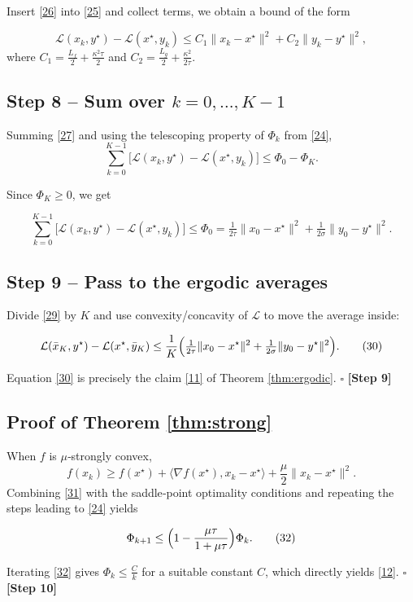 \documentclass{article}
\begin{document}
Insert \eqref{26} into \eqref{25} and collect terms, we obtain a bound of the form

\[
\mathcal L(x_{k},y^{\star})-\mathcal L(x^{\star},y_{k})
\le C_{1}\|x_{k}-x^{\star}\|^{2}+C_{2}\|y_{k}-y^{\star}\|^{2},
\tag{27}
\]
where $C_{1}=\tfrac{L_{f}}{2}+\tfrac{\kappa^{2}\tau}{2}$ and $C_{2}=\tfrac{L_{g}}{2}+\tfrac{\kappa^{2}}{2\tau}$.

\subsection*{Step 8 – Sum over $k=0,\dots,K-1$}
Summing \eqref{27} and using the telescoping property of $\Phi_{k}$ from \eqref{24},
\[
\sum_{k=0}^{K-1}\bigl[\mathcal L(x_{k},y^{\star})-\mathcal L(x^{\star},y_{k})\bigr]
\le \Phi_{0}-\Phi_{K}. \tag{28}
\]

Since $\Phi_{K}\ge0$, we get

\[
\sum_{k=0}^{K-1}\bigl[\mathcal L(x_{k},y^{\star})-\mathcal L(x^{\star},y_{k})\bigr]
\le \Phi_{0}
= \tfrac{1}{2\tau}\|x_{0}-x^{\star}\|^{2}
+\tfrac{1}{2\sigma}\|y_{0}-y^{\star}\|^{2}. \tag{29}
\]

\subsection*{Step 9 – Pass to the ergodic averages}
Divide \eqref{29} by $K$ and use convexity/concavity of $\mathcal L$ to move the average inside:

\[
\mathcal L(\bar x_{K},y^{\star})-\mathcal L(x^{\star},\bar y_{K})
\le \frac{1}{K}\Bigl(\tfrac{1}{2\tau}\|x_{0}-x^{\star}\|^{2}
+\tfrac{1}{2\sigma}\|y_{0}-y^{\star}\|^{2}\Bigr). \tag{30}
\]

Equation \eqref{30} is precisely the claim \eqref{11} of Theorem \ref{thm:ergodic}.  $\square$ \hfill\textbf{[Step 9]}

\subsection*{Proof of Theorem \ref{thm:strong}}
When $f$ is $\mu$‑strongly convex,
\[
f(x_{k})\ge f(x^{\star})+\langle \nabla f(x^{\star}),x_{k}-x^{\star}\rangle+\frac{\mu}{2}\|x_{k}-x^{\star}\|^{2}. \tag{31}
\]
Combining \eqref{31} with the saddle‑point optimality conditions and repeating the steps leading to \eqref{24} yields  

\[
\Phi_{k+1}\le \Bigl(1-\frac{\mu\tau}{1+\mu\tau}\Bigr)\Phi_{k}. \tag{32}
\]

Iterating \eqref{32} gives $\Phi_{k}\le \frac{C}{k}$ for a suitable constant $C$, which directly yields \eqref{12}. $\square$ \hfill\textbf{[Step 10]}
\end{document}
